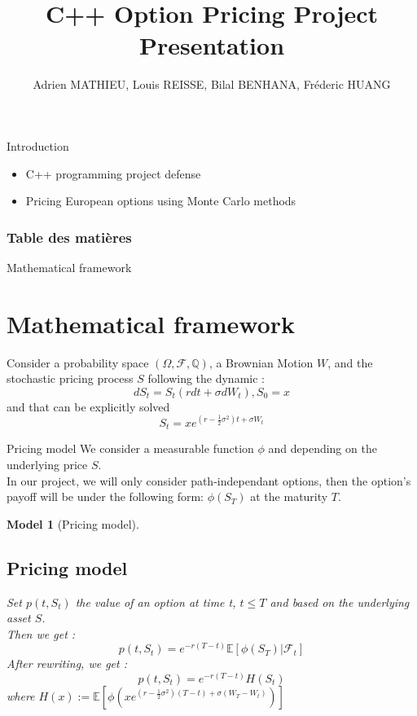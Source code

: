 \documentclass{beamer}
\title{C++ Option Pricing Project Presentation}
\author{Adrien MATHIEU, Louis REISSE, Bilal BENHANA, Fréderic HUANG}
\newtheorem{model}{Model}
\begin{document}
\frame{\titlepage}
\begin{frame}{Introduction}
    \begin{itemize}
        \item C++ programming project defense 
        \item Pricing European options using Monte Carlo methods
    \end{itemize}
\end{frame}
\begin{frame}
\frametitle{Table des matières}
\tableofcontents
\end{frame}
\begin{frame}{Mathematical framework}
\section{Mathematical framework}
Consider a probability space $(\Omega, \mathcal{F}, \mathbb{Q})$, a Brownian Motion $W$, and the stochastic pricing process $S$ following the  dynamic :   
   \begin{equation}
         dS_t = S_t(r dt + \sigma dW_t) ,S_0 = x
   \end{equation}
   and that can be explicitly solved 
   \begin{equation}
         S_t = x e^{(r - \frac{1}{2}\sigma^2)t + \sigma W_t}
   \end{equation}
   \end{frame}
   \begin{frame}{Pricing model}
       We consider a measurable function  $\phi$ and depending on the underlying price $S$.
    \\
    \newline
    In our project, we will only consider path-independant options, then the option's payoff will be under the following form:  $\phi(S_T)$ at the maturity $T$.
\begin{model}[Pricing model]
\subsection{Pricing model}
  Set $p(t,S_t)$ the value of an option at time t, $t \leq T$ and based on the underlying asset $S$.
    \\
    Then we get :
    \begin{equation}
        p(t,S_t) = e^{-r(T-t)}\mathbb{E}[\phi(S_T)\lvert \mathcal{F}_t ]
    \end{equation}
    After rewriting, we get :  
    \begin{equation}
        p(t,S_t) = e^{-r(T-t)}H(S_t)
    \end{equation}
    where $H(x) := \mathbb{E}[\phi(x e^{(r-\frac{1}{2}\sigma^2)(T-t) + \sigma(
    W_T-W_t)})]$
\end{model}

\end{frame}
\end{document}
